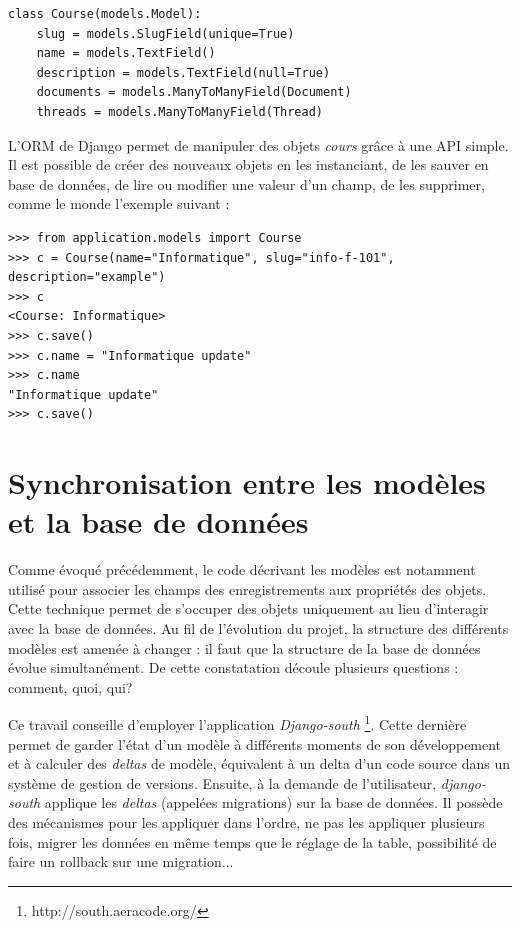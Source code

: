 \documentclass[a4paper,12pt]{article}
\begin{document}
\begin{verbatim}
class Course(models.Model):
    slug = models.SlugField(unique=True)
    name = models.TextField()
    description = models.TextField(null=True)
    documents = models.ManyToManyField(Document)
    threads = models.ManyToManyField(Thread)
\end{verbatim}

L'ORM de Django permet de manipuler des objets \textit{cours} grâce à une API simple.
Il est possible de créer des nouveaux objets en les instanciant, de les
sauver en base de données, de lire ou modifier une valeur d'un champ,
de les supprimer, comme le monde l'exemple suivant :

\begin{verbatim}
>>> from application.models import Course
>>> c = Course(name="Informatique", slug="info-f-101", description="example")
>>> c
<Course: Informatique>
>>> c.save()
>>> c.name = "Informatique update"
>>> c.name
"Informatique update"
>>> c.save()
\end{verbatim}


\section{Synchronisation entre les modèles et la base de données}

Comme évoqué précédemment, le code décrivant les
modèles est notamment utilisé pour associer les champs des enregistrements
aux propriétés des objets. Cette technique permet de s'occuper des objets uniquement au lieu 
d'interagir avec la base de données.
Au fil de l'évolution du projet, la structure des différents modèles
est amenée à changer : il faut que la structure de la base de données évolue simultanément.
De cette constatation découle plusieurs questions : comment, quoi, qui?

Ce travail conseille d'employer l'application \textit{Django-south}
\footnote{http://south.aeracode.org/}. Cette dernière permet de garder l'état d'un modèle
à différents moments de son développement et à calculer des \textit{deltas} de modèle, équivalent
à un delta d'un code source dans un système de gestion de versions. Ensuite,
à la demande de l'utilisateur, \textit{django-south} applique les \textit{deltas}
(appelées migrations) sur la base de données. Il possède des mécanismes pour les
appliquer dans l'ordre, ne pas les appliquer plusieurs fois, migrer les
données en même temps que le réglage de la table, possibilité de faire un rollback
sur une migration...
\end{document}
